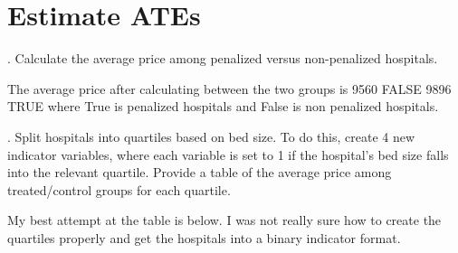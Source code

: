 \documentclass[
  letterpaper,
  DIV=11,
  numbers=noendperiod]{scrartcl}
\newenvironment{Shaded}{\begin{snugshade}}{\end{snugshade}}
\newcommand{\FunctionTok}[1]{\textcolor[rgb]{0.28,0.35,0.67}{#1}}
\newcommand{\NormalTok}[1]{\textcolor[rgb]{0.00,0.23,0.31}{#1}}
\newcommand{\SpecialCharTok}[1]{\textcolor[rgb]{0.37,0.37,0.37}{#1}}
\begin{document}
\section{Estimate ATEs}\label{estimate-ates}

\vspace{.2in}

. Calculate the average price among penalized versus
non-penalized hospitals.

The average price after calculating between the two groups is 9560 FALSE
9896 TRUE where True is penalized hospitals and False is non penalized
hospitals.

\newpage

. Split hospitals into quartiles based on bed size. To do
this, create 4 new indicator variables, where each variable is set to 1
if the hospital's bed size falls into the relevant quartile. Provide a
table of the average price among treated/control groups for each
quartile.

My best attempt at the table is below. I was not really sure how to
create the quartiles properly and get the hospitals into a binary
indicator format.

\begin{Shaded}
\end{Shaded}
\end{document}
